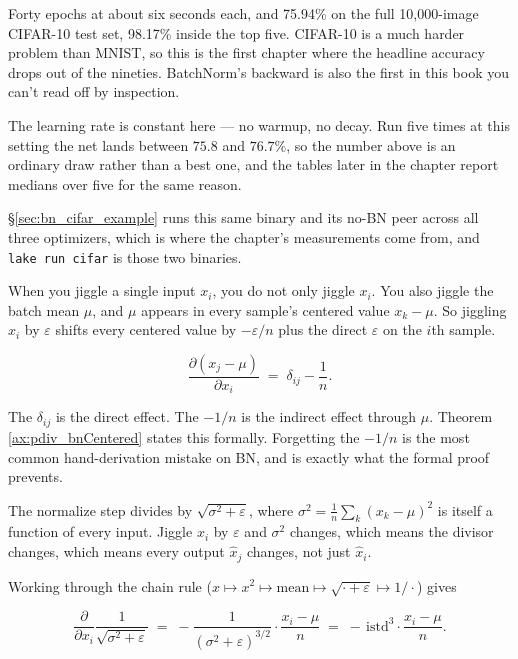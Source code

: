 Forty epochs at about six seconds each, and 75.94\% on the full
10,000-image CIFAR-10 test set, 98.17\% inside the top five. CIFAR-10
is a much harder problem than MNIST, so this is the first chapter where
the headline accuracy drops out of the nineties. BatchNorm's backward is
also the first in this book you can't read off by inspection.

\medskip\noindent The learning rate is constant here --- no warmup, no
decay. Run five times at this setting the net lands between
$75.8$ and $76.7\%$, so the number above is an ordinary
draw rather than a best one, and the tables later in the chapter report
medians over five for the same reason.

\S\ref{sec:bn_cifar_example} runs this same binary and its no-BN peer
across all three optimizers, which is where the chapter's measurements
come from, and \texttt{lake run cifar} is those two binaries.


When you
jiggle a single input \(x_i\), you do not only jiggle \(x_i\). You
also jiggle the batch mean \(\mu\), and \(\mu\) appears in every
sample's centered value \(x_k - \mu\). So jiggling \(x_i\) by
\(\varepsilon\) shifts every centered value by \(-\varepsilon/n\)
plus the direct \(\varepsilon\) on the \(i\)th sample.

\[
\frac{\partial (x_j - \mu)}{\partial x_i} \;=\; \delta_{ij} - \frac{1}{n}.
\]

The \(\delta_{ij}\) is the direct effect. The \(-1/n\) is the
indirect effect through \(\mu\). Theorem \ref{ax:pdiv_bnCentered}
states this formally. Forgetting the \(-1/n\) is the most common
hand-derivation mistake on BN, and is exactly what the formal
proof prevents.


The normalize step divides by \(\sqrt{\sigma^2 + \varepsilon}\),
where \(\sigma^2 = \frac{1}{n} \sum_k (x_k - \mu)^2\) is itself a
function of every input. Jiggle \(x_i\) by \(\varepsilon\) and
\(\sigma^2\) changes, which means the divisor changes, which means
every output \(\hat{x}_j\) changes, not just \(\hat{x}_i\).

Working through the chain rule (\(x \mapsto x^2 \mapsto \text{mean}
\mapsto \sqrt{\cdot + \varepsilon} \mapsto 1/\cdot\)) gives

\[
\frac{\partial}{\partial x_i} \frac{1}{\sqrt{\sigma^2 + \varepsilon}}
\;=\; -\frac{1}{(\sigma^2 + \varepsilon)^{3/2}} \cdot \frac{x_i - \mu}{n}
\;=\; -\,\mathrm{istd}^3 \cdot \frac{x_i - \mu}{n}.
\]

